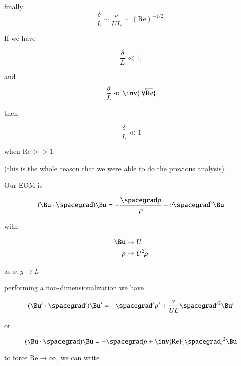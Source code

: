 finally
\begin{equation}\label{eqn:continuumL19:470}
\frac{\delta}{L} \sim \frac{\nu}{U L} \sim (\text{Re})^{-1/2}.
\end{equation}

If we have

\begin{equation}\label{eqn:continuumL19:490}
\frac{\delta}{L} \ll 1,
\end{equation}

and
\begin{equation}\label{eqn:continuumL19:510}
\frac{\delta}{L} \ll \inv{\sqrt{\text{Re}}}
\end{equation}

then

\begin{equation}\label{eqn:continuumL19:530}
\frac{\delta}{L} \ll 1
\end{equation}

when $\text{Re} >> 1$.

(this is the whole reason that we were able to do the previous analysis).

Our EOM is

\begin{equation}\label{eqn:continuumL19:550}
(\Bu \cdot \spacegrad) \Bu = -\frac{\spacegrad p}{\rho } + \nu \spacegrad^2 \Bu
\end{equation}

with 

\begin{align}\label{eqn:continuumL19:570}
\Bu &\rightarrow U \\
p &\rightarrow U^2 \rho
\end{align}

as $x, y \rightarrow L$

performing a non-dimensionalization we have

\begin{equation}\label{eqn:continuumL19:590}
(\Bu' \cdot \spacegrad') \Bu' = -\spacegrad' p' + \frac{\nu}{U L} {\spacegrad'}^2 \Bu'
\end{equation}

or

\begin{equation}\label{eqn:continuumL19:610}
(\Bu \cdot \spacegrad) \Bu = -\spacegrad p + \inv{\text{Re}} {\spacegrad}^2 \Bu
\end{equation}

to force $\text{Re} \rightarrow \infty$, we can write

